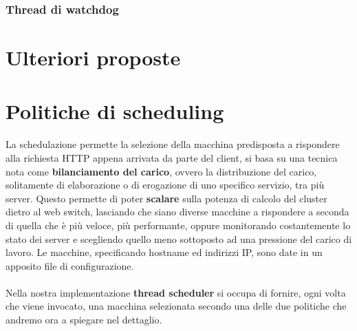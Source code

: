 \documentclass[italian]{tktltiki2}
\begin{document}
\subsubsection{Thread di watchdog}
\label{sec:watchdog}

\newpage
\section{Ulteriori proposte}

\newpage
\section{Politiche di scheduling} \label{sec: sched_p}
La schedulazione permette la selezione della macchina predisposta a rispondere alla richiesta HTTP appena arrivata da parte del client, si basa su una tecnica nota come \textbf{bilanciamento del carico}, ovvero la distribuzione del carico, solitamente di elaborazione o di erogazione di uno specifico servizio, tra più server. Questo permette di poter \textbf{scalare} sulla potenza di calcolo del cluster dietro al web switch, lasciando che siano diverse macchine a rispondere a seconda di quella che è più veloce, più performante, oppure monitorando costantemente lo stato dei server e scegliendo quello meno sottoposto ad una pressione del carico di lavoro. Le macchine, specificando hostname ed indirizzi IP, sono date in un apposito file di configurazione.\\\\ 
Nella nostra implementazione \textbf{thread scheduler} si occupa di fornire,  ogni volta che viene invocato, una macchina selezionata secondo una delle due politiche che andremo ora a spiegare nel dettaglio.
\end{document}
